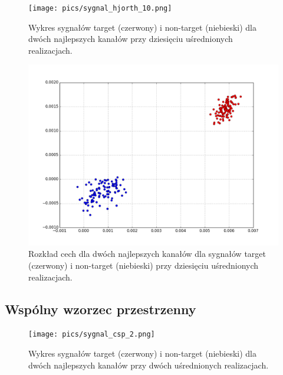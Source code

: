 \documentclass[licencjacka,openright]{pracamgr}
\begin{document}
\begin{figure}[H]
\centering
\texttt{[image: pics/sygnal\_hjorth\_10.png]}
\caption{Wykres sygnałów target (czerwony) i non-target (niebieski) dla dwóch najlepszych kanałów przy dziesięciu uśrednionych realizacjach.}
\label{sygnal_hjorth_10}
\end{figure}

\begin{figure}[H]
\centering
\includegraphics[scale=0.55, trim=0mm 0mm 0mm 0mm, clip=True]{pics/cecha_hjorth_10.png}
\caption{Rozkład cech dla dwóch najlepszych kanałów dla sygnałów target (czerwony) i non-target (niebieski) przy dziesięciu uśrednionych realizacjach.}
\label{cecha_hjorth_10}
\end{figure}


\subsection{Wspólny wzorzec przestrzenny}

\begin{figure}[H]
\centering
\texttt{[image: pics/sygnal\_csp\_2.png]}
\caption{Wykres sygnałów target (czerwony) i non-target (niebieski) dla dwóch najlepszych kanałów przy dwóch uśrednionych realizacjach.}
\label{sygnal_csp_2}
\end{figure}
\end{document}
